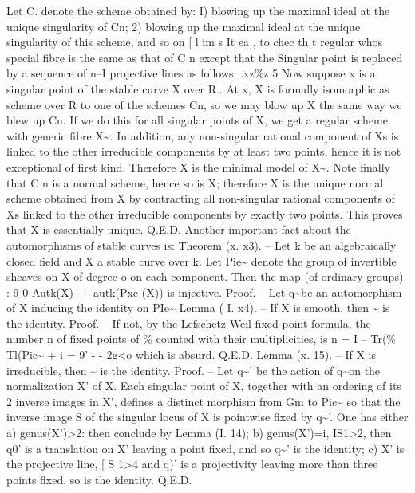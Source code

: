 \documentclass[11pt]{article}
\theoremstyle{plain}
\theoremstyle{definition}
\theoremstyle{remark}
\begin{document}
Let C. denote the scheme obtained by: I) blowing up the maximal ideal at the unique singularity of Cn; 2) blowing up the maximal ideal at the unique singularity of this scheme, and so on [ l im s It ea , to chec th t regular whos special fibre is the same as that of C n except that the Singular point is replaced by a sequence of n--I projective lines as follows: .xz\%z 5 Now suppose x is a singular point of the stable curve X over R.. At x, X is formally isomorphic as scheme over R to one of the schemes Cn, so we may blow up X the same way we blew up Cn. If we do this for all singular points of X, we get a regular scheme with generic fibre X\textasciitilde{}. In addition, any non-singular rational component of Xs is linked to the other irreducible components by at least two points, hence it is not exceptional of first kind. Therefore X is the minimal model of X\textasciitilde{}. Note finally that C n is a normal scheme, hence so is X; therefore X is the unique normal scheme obtained from X by contracting all non-singular rational components of Xs linked to the other irreducible components by exactly two points. This proves that X is essentially unique. Q.E.D. Another important fact about the automorphisms of stable curves is: Theorem (x. x3). -- Let k be an algebraically closed field and X a stable curve over k. Let Pie\textasciitilde{} denote the group of invertible sheaves on X of degree o on each component. Then the map (of ordinary groups) : 9 0 Autk(X) -+ autk(Pxc (X)) is injective. Proof. -- Let q\textasciitilde{}be an automorphism of X inducing the identity on PIe\textasciitilde{} Lemma ( I. x4). -- If X is smooth, then \textasciitilde{} is the identity. Proof. -- If not, by the Lefschetz-Weil fixed point formula, the number n of fixed points of \% counted with their multiplicities, is n = I -- Tr(\% Tl(Pic\textasciitilde{} + i = 9' - - 2g<o which is absurd. Q.E.D. Lemma (x. 15). -- If X is irreducible, then \textasciitilde{} is the identity. Proof. -- Let q\textasciitilde{}' be the action of q\textasciitilde{}on the normalization X' of X. Each singular point of X, together with an ordering of its 2 inverse images in X', defines a distinct morphism from Gm to Pic\textasciitilde{} so that the inverse image S of the singular locus of X is pointwise fixed by q\textasciitilde{}'. One has either a) genus(X')>2: then conclude by Lemma (I. 14); b) genus(X')=i, IS1>2, then q0' is a translation on X' leaving a point fixed, and so q\textasciitilde{}' is the identity; c) X' is the projective line, [ S 1>4 and q)' is a projectivity leaving more than three points fixed, so is the identity. Q.E.D.
\end{document}
